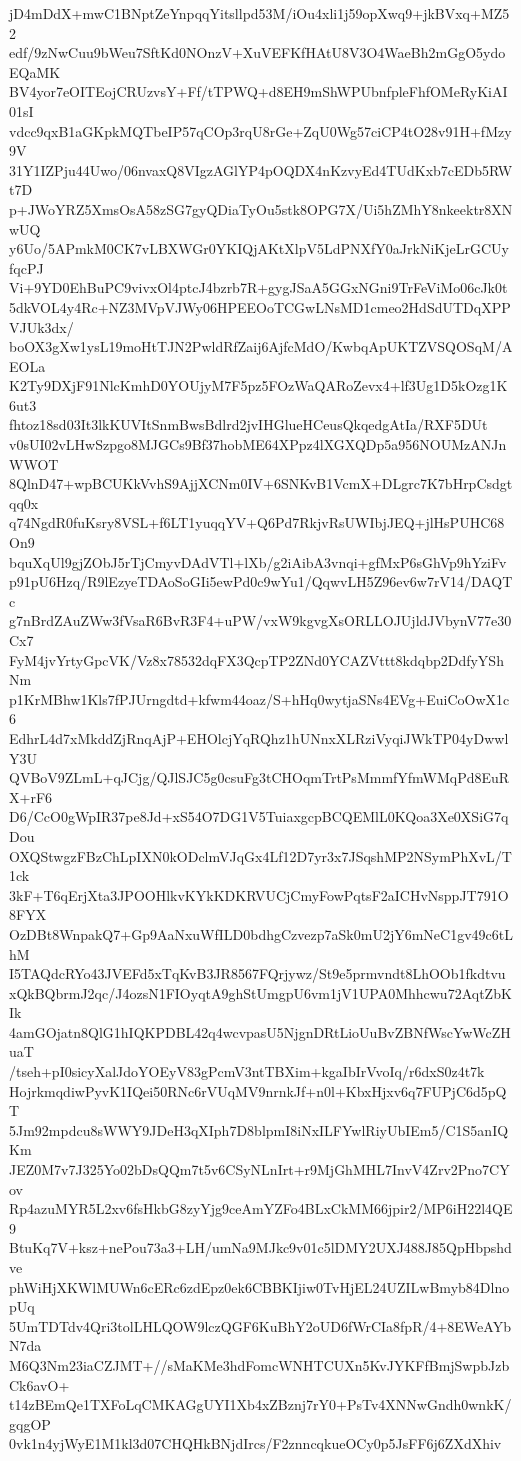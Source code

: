 jD4mDdX+mwC1BNptZeYnpqqYitsllpd53M/iOu4xli1j59opXwq9+jkBVxq+MZ52
edf/9zNwCuu9bWeu7SftKd0NOnzV+XuVEFKfHAtU8V3O4WaeBh2mGgO5ydoEQaMK
BV4yor7eOITEojCRUzvsY+Ff/tTPWQ+d8EH9mShWPUbnfpleFhfOMeRyKiAI01sI
vdcc9qxB1aGKpkMQTbeIP57qCOp3rqU8rGe+ZqU0Wg57ciCP4tO28v91H+fMzy9V
31Y1IZPju44Uwo/06nvaxQ8VIgzAGlYP4pOQDX4nKzvyEd4TUdKxb7cEDb5RWt7D
p+JWoYRZ5XmsOsA58zSG7gyQDiaTyOu5stk8OPG7X/Ui5hZMhY8nkeektr8XNwUQ
y6Uo/5APmkM0CK7vLBXWGr0YKIQjAKtXlpV5LdPNXfY0aJrkNiKjeLrGCUyfqcPJ
Vi+9YD0EhBuPC9vivxOl4ptcJ4bzrb7R+gygJSaA5GGxNGni9TrFeViMo06cJk0t
5dkVOL4y4Rc+NZ3MVpVJWy06HPEEOoTCGwLNsMD1cmeo2HdSdUTDqXPPVJUk3dx/
boOX3gXw1ysL19moHtTJN2PwldRfZaij6AjfcMdO/KwbqApUKTZVSQOSqM/AEOLa
K2Ty9DXjF91NlcKmhD0YOUjyM7F5pz5FOzWaQARoZevx4+lf3Ug1D5kOzg1K6ut3
fhtoz18sd03It3lkKUVItSnmBwsBdlrd2jvIHGlueHCeusQkqedgAtIa/RXF5DUt
v0sUI02vLHwSzpgo8MJGCs9Bf37hobME64XPpz4lXGXQDp5a956NOUMzANJnWWOT
8QlnD47+wpBCUKkVvhS9AjjXCNm0IV+6SNKvB1VcmX+DLgrc7K7bHrpCsdgtqq0x
q74NgdR0fuKsry8VSL+f6LT1yuqqYV+Q6Pd7RkjvRsUWIbjJEQ+jlHsPUHC68On9
bquXqUl9gjZObJ5rTjCmyvDAdVTl+lXb/g2iAibA3vnqi+gfMxP6sGhVp9hYziFv
p91pU6Hzq/R9lEzyeTDAoSoGIi5ewPd0c9wYu1/QqwvLH5Z96ev6w7rV14/DAQTc
g7nBrdZAuZWw3fVsaR6BvR3F4+uPW/vxW9kgvgXsORLLOJUjldJVbynV77e30Cx7
FyM4jvYrtyGpcVK/Vz8x78532dqFX3QcpTP2ZNd0YCAZVttt8kdqbp2DdfyYShNm
p1KrMBhw1Kls7fPJUrngdtd+kfwm44oaz/S+hHq0wytjaSNs4EVg+EuiCoOwX1c6
EdhrL4d7xMkddZjRnqAjP+EHOlcjYqRQhz1hUNnxXLRziVyqiJWkTP04yDwwlY3U
QVBoV9ZLmL+qJCjg/QJlSJC5g0csuFg3tCHOqmTrtPsMmmfYfmWMqPd8EuRX+rF6
D6/CcO0gWpIR37pe8Jd+xS54O7DG1V5TuiaxgcpBCQEMlL0KQoa3Xe0XSiG7qDou
OXQStwgzFBzChLpIXN0kODclmVJqGx4Lf12D7yr3x7JSqshMP2NSymPhXvL/T1ck
3kF+T6qErjXta3JPOOHlkvKYkKDKRVUCjCmyFowPqtsF2aICHvNsppJT791O8FYX
OzDBt8WnpakQ7+Gp9AaNxuWfILD0bdhgCzvezp7aSk0mU2jY6mNeC1gv49c6tLhM
I5TAQdcRYo43JVEFd5xTqKvB3JR8567FQrjywz/St9e5prmvndt8LhOOb1fkdtvu
xQkBQbrmJ2qc/J4ozsN1FIOyqtA9ghStUmgpU6vm1jV1UPA0Mhhcwu72AqtZbKIk
4amGOjatn8QlG1hIQKPDBL42q4wcvpasU5NjgnDRtLioUuBvZBNfWscYwWcZHuaT
/tseh+pI0sicyXalJdoYOEyV83gPcmV3ntTBXim+kgaIbIrVvoIq/r6dxS0z4t7k
HojrkmqdiwPyvK1IQei50RNc6rVUqMV9nrnkJf+n0l+KbxHjxv6q7FUPjC6d5pQT
5Jm92mpdcu8sWWY9JDeH3qXIph7D8blpmI8iNxILFYwlRiyUbIEm5/C1S5anIQKm
JEZ0M7v7J325Yo02bDsQQm7t5v6CSyNLnIrt+r9MjGhMHL7InvV4Zrv2Pno7CYov
Rp4azuMYR5L2xv6fsHkbG8zyYjg9ceAmYZFo4BLxCkMM66jpir2/MP6iH22l4QE9
BtuKq7V+ksz+nePou73a3+LH/umNa9MJkc9v01c5lDMY2UXJ488J85QpHbpshdve
phWiHjXKWlMUWn6cERc6zdEpz0ek6CBBKIjiw0TvHjEL24UZILwBmyb84DlnopUq
5UmTDTdv4Qri3tolLHLQOW9lczQGF6KuBhY2oUD6fWrCIa8fpR/4+8EWeAYbN7da
M6Q3Nm23iaCZJMT+//sMaKMe3hdFomcWNHTCUXn5KvJYKFfBmjSwpbJzbCk6avO+
t14zBEmQe1TXFoLqCMKAGgUYI1Xb4xZBznj7rY0+PsTv4XNNwGndh0wnkK/gqgOP
0vk1n4yjWyE1M1kl3d07CHQHkBNjdIrcs/F2znncqkueOCy0p5JsFF6j6ZXdXhiv
